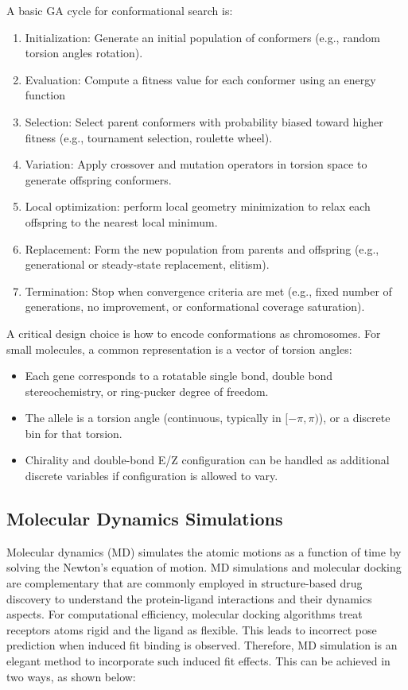 \documentclass[12pt]{article}
\begin{document}
A basic GA cycle for conformational search is:

\begin{enumerate}
  \item Initialization: Generate an initial population of conformers (e.g., random torsion angles rotation).
  \item Evaluation: Compute a fitness value for each conformer using an energy function
  \item Selection: Select parent conformers with probability biased toward higher fitness (e.g., tournament selection, roulette wheel).
  \item Variation: Apply crossover and mutation operators in torsion space to generate offspring conformers.
  \item Local optimization: perform local geometry minimization to relax each offspring to the nearest local minimum.
  \item Replacement: Form the new population from parents and offspring (e.g., generational or steady-state replacement, elitism).
  \item Termination: Stop when convergence criteria are met (e.g., fixed number of generations, no improvement, or conformational coverage saturation).
\end{enumerate}


A critical design choice is how to encode conformations as chromosomes. For small molecules, a common representation is a vector of torsion angles: \cite{CH2_Judson1993,CH2_Goodman1998,CH2_Mekenyan1999}

\begin{itemize}
  \item Each gene corresponds to a rotatable single bond, double bond stereochemistry, or ring-pucker degree of freedom.
  \item The allele is a torsion angle (continuous, typically in $[-\pi, \pi)$), or a discrete bin for that torsion.
  \item Chirality and double-bond E/Z configuration can be handled as additional discrete variables if configuration is allowed to vary.
\end{itemize}
 

\subsection{Molecular Dynamics Simulations}

 Molecular dynamics (MD) simulates the atomic motions as a function of time by solving the Newton's equation of motion.  MD simulations and molecular docking are complementary\cite{CH2_guterres2020improving} that are commonly employed in structure-based drug discovery to understand the protein-ligand interactions and their dynamics aspects. For computational efficiency, molecular docking algorithms treat receptors atoms rigid and the ligand as flexible. This leads to incorrect pose prediction when induced fit binding is observed\cite{CH2_salmaso2018bridging}. Therefore, MD simulation is an elegant method to incorporate such induced fit effects. This can be achieved in two ways, as shown below:
\end{document}
